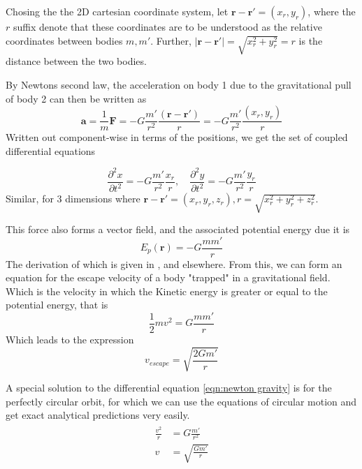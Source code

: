 \documentclass[10pt,showpacs,preprintnumbers,amsmath,amssymb,nofootinbib,aps,prl,twocolumn,groupedaddress,superscriptaddress,showkeys]{revtex4-1}
\begin{document}
    Chosing the the 2D cartesian coordinate system, let $\mathbf r - \mathbf r'= (x_{r}, y_{r})$, where the $r$ suffix denote that these coordinates are to be understood as the relative coordinates between bodies $m, m'$.
    Further, $|\mathbf r - \mathbf r'| = \sqrt{x_r^2 + y_r^2} = r$ is the distance between the two bodies.

    By Newtons second law, the acceleration on body 1 due to the gravitational pull of body 2 can then be written as
    \begin{equation}
      \mathbf a = \frac{1}{m}\mathbf F = -G \frac{m'}{r^2}\frac{(\mathbf r-\mathbf r')}{r} = -G\frac{m'}{r^2}\frac{\left(x_r, y_r\right)}{r}
    \end{equation}
    Written out component-wise in terms of the positions, we get the set of coupled differential equations

    \begin{equation}
      \frac{\partial^2 x}{\partial t^2} = -G\frac{m'}{r^2}\frac{x_r}{r}, \quad
      \frac{\partial^2 y}{\partial t^2} = -G\frac{m'}{r^2}\frac{y_r}{r}
    \end{equation}
    Similar, for 3 dimensions where $\mathbf r - \mathbf r' = (x_r, y_r, z_r), r=\sqrt{x_r^2 + y_r^2 + z_r^2}$.

    This force also forms a vector field, and the associated potential energy due it is
    \begin{equation}
      E_p(\mathbf r) = -G\frac{mm'}{r}
    \end{equation}
    The derivation of which is given in \cite{elem}, and elsewhere.
    From this, we can form an equation for the escape velocity of a body "trapped" in a gravitational field. Which is the velocity in which the Kinetic energy is greater or equal to the potential energy, that is
    \begin{equation}
      \frac{1}{2}m v^2 = G\frac{mm'}{r}
    \end{equation}
    Which leads to the expression
    \begin{equation}
      v_{escape} = \sqrt{\frac{2Gm'}{r}}
      \label{eqn:escapevel}
    \end{equation}

    A special solution to the differential equation \ref{eqn:newton gravity} is for the perfectly circular orbit, for which we can use the equations of circular motion and get exact analytical predictions very easily. 
    \begin{align}
    \begin{split}
      \frac{v^2}{r} &= G\frac{m'}{r^2}
      \\ v &= \sqrt{\frac{Gm'}{r}}
    \end{split}
    \end{align}
\end{document}
